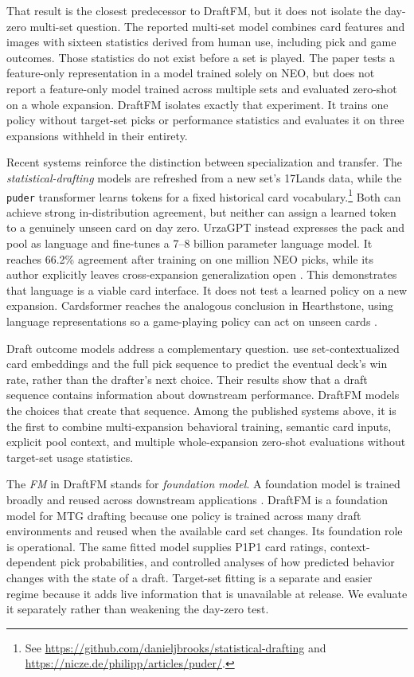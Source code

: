 \documentclass[11pt]{article}
\numberwithin{equation}{section}
\begin{document}
That result is the closest predecessor to DraftFM, but it does not isolate the
day-zero multi-set question. The reported multi-set model combines card
features and images with sixteen statistics derived from human use, including
pick and game outcomes. Those statistics do not exist before a set is played.
The paper tests a feature-only representation in a model trained solely on NEO,
but does not report a feature-only model trained across multiple sets and
evaluated zero-shot on a whole expansion. DraftFM isolates exactly that experiment.
It trains one policy without target-set picks or performance statistics and
evaluates it on three expansions withheld in their entirety.

Recent systems reinforce the distinction between specialization and transfer.
The \emph{statistical-drafting} models are refreshed from a new set's
17Lands data, while the \texttt{puder} transformer learns tokens for a fixed
historical card vocabulary.\footnote{See
\url{https://github.com/danieljbrooks/statistical-drafting} and
\url{https://nicze.de/philipp/articles/puder/}.} Both can achieve strong
in-distribution agreement, but neither can assign a learned token to a genuinely
unseen card on day zero. UrzaGPT instead expresses the pack and pool as language
and fine-tunes a 7--8 billion parameter language model. It reaches 66.2\%
agreement after training on one million NEO picks, while its author explicitly
leaves cross-expansion generalization open \citep{bertram2025}. This
demonstrates that
language is a viable card interface. It does not test a learned policy on a new
expansion. Cardsformer reaches the analogous conclusion in Hearthstone, using
language representations so a game-playing policy can act on unseen
cards \citep{xia2023}.

Draft outcome models address a complementary question. \citet{rigaux2026} use
set-contextualized card embeddings and the full pick sequence to predict the
eventual deck's win rate, rather than the drafter's next choice. Their results show that a draft sequence
contains information about downstream performance. DraftFM models the choices
that create that sequence. Among the published systems above, it is the first
to combine multi-expansion behavioral training, semantic card inputs, explicit
pool context, and multiple whole-expansion zero-shot evaluations without
target-set usage statistics.

The \emph{FM} in DraftFM stands for \emph{foundation model}. A foundation model
is trained broadly and reused across downstream applications
\citep{bommasani2021}. DraftFM is a foundation model for
MTG drafting because one policy is trained across many draft environments and
reused when the available card set changes. Its foundation role is operational. The same
fitted model supplies P1P1 card ratings, context-dependent pick probabilities,
and controlled analyses of how predicted behavior changes with the state of a
draft. Target-set fitting is a separate and easier regime because it adds live
information that is unavailable at release. We evaluate it separately rather
than weakening the day-zero test.
\end{document}
